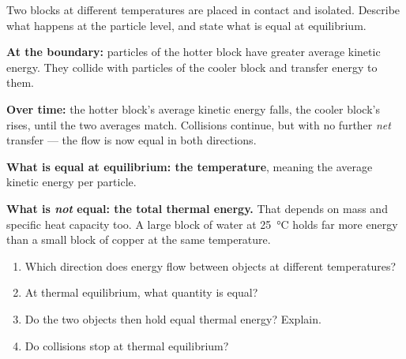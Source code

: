 \documentclass{apchem-worksheet}
\begin{document}
\begin{workedexample}
Two blocks at different temperatures are placed in contact and isolated.
Describe what happens at the particle level, and state what is equal at
equilibrium.

\textbf{At the boundary:} particles of the hotter block have greater
average kinetic energy. They collide with particles of the cooler block
and transfer energy to them.

\textbf{Over time:} the hotter block's average kinetic energy falls, the
cooler block's rises, until the two averages match. Collisions continue,
but with no further \emph{net} transfer --- the flow is now equal in both
directions.

\textbf{What is equal at equilibrium: the temperature}, meaning the
average kinetic energy per particle.

\textbf{What is \emph{not} equal: the total thermal energy.} That depends
on mass and specific heat capacity too. A large block of water at
\SI{25}{\celsius} holds far more energy than a small block of copper at
the same temperature.
\end{workedexample}

\begin{yourturn}
\begin{enumerate}[leftmargin=*,itemsep=0.5em]
  \item Which direction does energy flow between objects at different
        temperatures? \workspace[1.4cm]
  \item At thermal equilibrium, what quantity is equal?
        \workspace[1.4cm]
  \item Do the two objects then hold equal thermal energy? Explain.
        \workspace[1.8cm]
  \item Do collisions stop at thermal equilibrium? \workspace[1.6cm]
\end{enumerate}
\end{yourturn}
\end{document}
